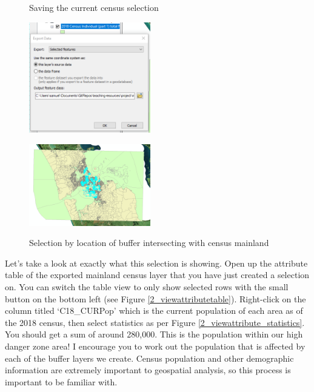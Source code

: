 \documentclass{article}
\begin{document}
\begin{figure}[h]
  \centering
  \begin{minipage}[b]{0.4\textwidth}
    \centering
    \caption{Saving the current census selection}
    \includegraphics[width=200px]{images/part2/saveselectedfeatures.PNG}
    \label{2_saveselected}
  \end{minipage}
  \hfill
  \begin{minipage}[b]{0.4\textwidth}
    \centering
    \caption{Selection by location of buffer intersecting with census mainland}
    \includegraphics[width=200px]{images/part2/selection_mainland_buffer.PNG}
    \label{2_selection_mainland_buffer}
  \end{minipage}
\end{figure}
\pagebreak

Let's take a look at exactly what this selection is showing. Open up the attribute table of the exported mainland census layer that you have just created a selection on. You can switch the table view to only show selected rows with the small button on the bottom left (see Figure \ref{2_viewattributetable}). Right-click on the column titled `C18\_CURPop' which is the current population of each area as of the 2018 census, then select statistics as per Figure \ref{2_viewattribute_statistics}. You should get a sum of around 280,000. This is the population within our high danger zone area! I encourage you to work out the population that is affected by each of the buffer layers we create. Census population and other demographic information are extremely important to geospatial analysis, so this process is important to be familiar with.
\end{document}
